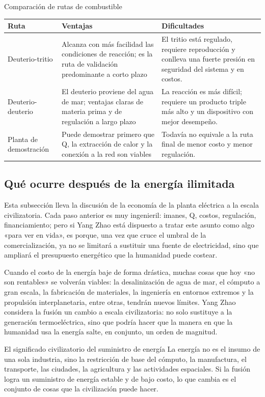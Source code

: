 \documentclass[a4paper]{article}
\begin{document}
\begin{knowledgebox}{Comparación de rutas de combustible}
\begin{tabularx}{\textwidth}{p{}p{}X}
\toprule
Ruta & Ventajas & Dificultades \\
\midrule
Deuterio-tritio & Alcanza con más facilidad las condiciones de reacción; es la ruta de validación predominante a corto plazo & El tritio está regulado, requiere reproducción y conlleva una fuerte presión en seguridad del sistema y en costos. \\
Deuterio-deuterio & El deuterio proviene del agua de mar; ventajas claras de materia prima y de regulación a largo plazo & La reacción es más difícil; requiere un producto triple más alto y un dispositivo con mejor desempeño. \\
Planta de demostración & Puede demostrar primero que Q, la extracción de calor y la conexión a la red son viables & Todavía no equivale a la ruta final de menor costo y menor regulación. \\
\bottomrule
\end{tabularx}
\end{knowledgebox}

\subsection{Qué ocurre después de la energía ilimitada}

Esta subsección lleva la discusión de la economía de la planta eléctrica a la escala civilizatoria. Cada paso anterior es muy ingenieril: imanes, Q, costos, regulación, financiamiento; pero si Yang Zhao está dispuesto a tratar este asunto como algo «para ver en vida», es porque, una vez que cruce el umbral de la comercialización, ya no se limitará a sustituir una fuente de electricidad, sino que ampliará el presupuesto energético que la humanidad puede costear.

Cuando el costo de la energía baje de forma drástica, muchas cosas que hoy «no son rentables» se volverán viables: la desalinización de agua de mar, el cómputo a gran escala, la fabricación de materiales, la ingeniería en entornos extremos y la propulsión interplanetaria, entre otras, tendrán nuevos límites. Yang Zhao considera la fusión un cambio a escala civilizatoria: no solo sustituye a la generación termoeléctrica, sino que podría hacer que la manera en que la humanidad usa la energía salte, en conjunto, un orden de magnitud.

\begin{importantbox}{El significado civilizatorio del suministro de energía}
La energía no es el insumo de una sola industria, sino la restricción de base del cómputo, la manufactura, el transporte, las ciudades, la agricultura y las actividades espaciales. Si la fusión logra un suministro de energía estable y de bajo costo, lo que cambia es el conjunto de cosas que la civilización puede hacer.
\end{importantbox}
\end{document}
